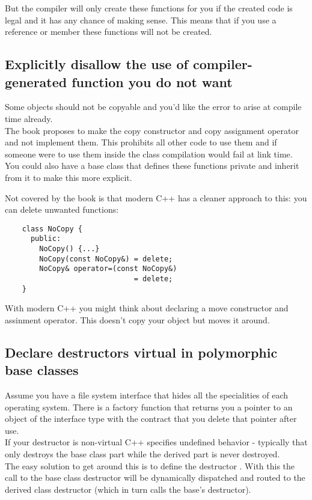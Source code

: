 \documentclass[a4paper, twocolumn]{article}
\let\oldsubsection\subsection
\newcounter{mysubsection}
\renewcommand{\subsection}{
    \stepcounter{mysubsection}
    \oldsubsection
}
\newcommand{\code}[1]{\texttt{\color{black}{#1}}}
\begin{document}
But the compiler will only create these functions for you if the created code is legal and it has any chance of making sense. This means that if you use a reference or \code{const} member these functions will not be created.

\subsection{Explicitly disallow the use of compiler-generated function you do not want} \label{ssec:DeleteCompilerFunctions}
Some objects should not be copyable and you'd like the error to arise at compile time already.\\
The book proposes to make the copy constructor and copy assignment operator \code{private} and not implement them. This prohibits all other code to use them and if someone were to use them inside the class compilation would fail at link time.\\
You could also have a base class that defines these functions private and inherit from it to make this more explicit.

Not covered by the book is that modern C++ has a cleaner approach to this: you can delete unwanted functions:
\begin{verbatim}
	class NoCopy {
	  public:
	    NoCopy() {...}
	    NoCopy(const NoCopy&) = delete;
	    NoCopy& operator=(const NoCopy&)
	                          = delete;
	}
\end{verbatim}
With modern C++ you might think about declaring a move constructor and assinment operator. This doesn't copy your object but moves it around.

\subsection{Declare destructors virtual in polymorphic base classes}
Assume you have a file system interface that hides all the specialities of each operating system. There is a factory function that returns you a pointer to an object of the interface type with the contract that you delete that pointer after use.\\
If your destructor is non-virtual \code{delete} C++ specifies undefined behavior - typically that only destroys the base class part while the derived part is never destroyed.\\
The easy solution to get around this is to define the destructor \code{virtual}. With this the call to the base class destructor will be dynamically dispatched and routed to the derived class destructor (which in turn calls the base's destructor).
\end{document}
